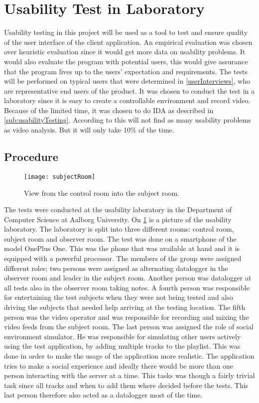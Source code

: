 \section{Usability Test in Laboratory}
Usability testing in this project will be used as a tool to test and
ensure quality of the user interface of the client application. An empirical evaluation was chosen over heuristic evaluation since it would get more data on usability problems. It would also evaluate the program with potential users, this would give assurance that the program lives up to the users' expectation and requirements. The tests will be performed on
typical users that were determined in \cref{userInterviews}, who are
representative end users of the product. It was chosen to conduct the
test in a laboratory since it is easy to create a controllable
environment and record video. Because of the limited time, it was
chosen to do IDA as described in \cref{sub:usabilityTesting}. According to \cite{kjeldskov2004instant} this will not find as many usability problems as video analysis. But it will only take 10\% of the time.

\subsection{Procedure}
\begin{figure}[hbtp]
  \centering
  \texttt{[image: subjectRoom]}
  \caption{View from the control room into the subject room.}\label{fig:subjectRoom}
\end{figure}

The tests were conducted at the usability laboratory in the Department of Computer Science at Aalborg University. On \cref{fig:subjectRoom} is a picture of the usability laboratory. The laboratory is split into three different rooms: control room, subject room and observer room. The test was done on a smartphone of the model OnePlus One. This was the phone that was available at hand and it is equipped with a powerful processor. The members of the group were assigned different roles; two persons were assigned as alternating datalogger in the observer room and leader in the subject room. Another person was datalogger at all tests also in the observer room taking notes. A fourth person was responsible for entertaining the test subjects when they were not being tested and also driving the subjects that needed help arriving at the testing location. The fifth person was the video operator and was responsible for recording and mixing the video feeds from the subject room. The last person was assigned the role of social environment simulator. He was responsible for simulating other users actively using the test application, by adding multiple tracks to the playlist. This was done in order to make the usage of the application more realistic. The application tries to make a social experience and ideally there would be more than one person interacting with the server at a time. This tasks was though a fairly trivial task since all tracks and when to add them where decided before the tests. This last person therefore also acted as a datalogger most of the time.

